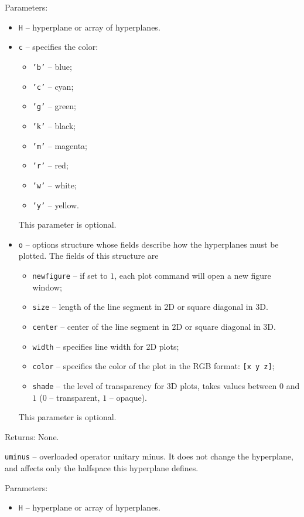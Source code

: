 Parameters:
\begin{itemize}
\item {\tt H} -- hyperplane or array of hyperplanes.
\item {\tt c} -- specifies the color:
\begin{itemize}
\item {\tt 'b'} -- blue;
\item {\tt 'c'} -- cyan;
\item {\tt 'g'} -- green;
\item {\tt 'k'} -- black;
\item {\tt 'm'} -- magenta;
\item {\tt 'r'} -- red;
\item {\tt 'w'} -- white;
\item {\tt 'y'} -- yellow.
\end{itemize}
This parameter is optional.
\item {\tt o} -- options structure whose fields describe how the hyperplanes
must be plotted. The fields of this structure are
\begin{itemize}
\item {\tt newfigure} -- if set to $1$, each plot command will open a new
figure window;
\item {\tt size} -- length of the line segment in 2D or square diagonal in 3D.
\item {\tt center} -- center of the line segment in 2D or square diagonal in 3D.
\item {\tt width} -- specifies line width for 2D plots;
\item {\tt color} -- specifies the color of the plot in the RGB format:
{\tt [x y z]};
\item {\tt shade} -- the level of transparency for 3D plots, takes values
between $0$ and $1$ ($0$ -- transparent, $1$ -- opaque).
\end{itemize}
This parameter is optional.
\end{itemize}

Returns: None.

\newpage

{\Large {\tt uminus}} -- overloaded operator unitary minus. It does not change
the hyperplane, and affects only the halfspace this hyperplane defines.

Parameters:
\begin{itemize}
\item {\tt H} -- hyperplane or array of hyperplanes.
\end{itemize}


